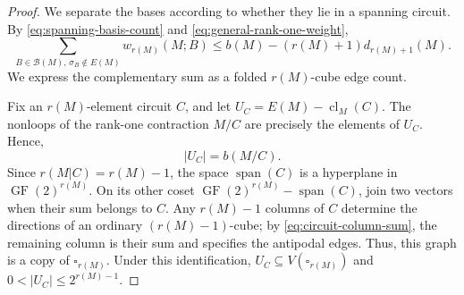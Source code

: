 \documentclass[10pt,a4paper]{article}
\numberwithin{equation}{section}
\DeclareMathOperator{\GF}{GF}
\DeclareMathOperator{\cl}{cl}
\DeclareMathOperator{\spanof}{span}
\newcommand{\BB}{\mathcal B}
\newcommand{\FF}{\GF(2)}
\newcommand{\wloc}[1]{w_{#1}(M;B)}
\begin{document}
\begin{proof}
We separate the bases according to whether they lie in a spanning circuit.
By \eqref{eq:spanning-basis-count} and \eqref{eq:general-rank-one-weight},
\begin{equation}\label{eq:basis}
 \sum_{B\in\BB(M),\,\sigma_B\notin E(M)}\wloc{r(M)}
 \le b(M)-(r(M)+1)d_{r(M)+1}(M).
\end{equation}
We express the complementary sum as a folded \(r(M)\)-cube edge count.

Fix an \(r(M)\)-element circuit \(C\), and let
\(U_C=E(M)-\cl_M(C)\).
The nonloops of the rank-one contraction \(M/C\) are precisely
the elements of \(U_C\). Hence,
\begin{equation}\label{eq:outside-hyperplane}
 |U_C|=b(M/C).
\end{equation}
Since \(r(M|C)=r(M)-1\), the space \(\spanof(C)\) is a hyperplane in \(\FF^{r(M)}\).
On its other coset \(\FF^{r(M)}-\spanof(C)\), join two vectors
when their sum belongs to \(C\). Any \(r(M)-1\) columns of \(C\) determine the
directions of an ordinary \((r(M)-1)\)-cube; by \eqref{eq:circuit-column-sum},
the remaining column is their sum and specifies the antipodal edges.
Thus, this graph is a copy of \(\square_{r(M)}\). Under this identification,
\(U_C\subseteq V(\square_{r(M)})\) and
\(0<|U_C|\le2^{r(M)-1}\).


\end{proof}
\end{document}
